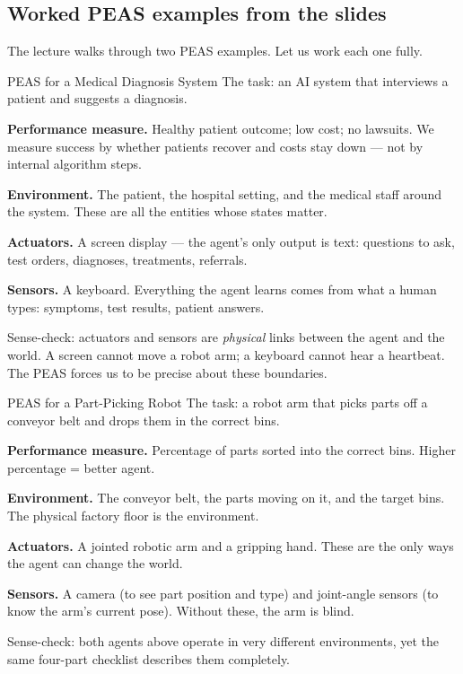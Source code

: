 \documentclass[a4paper,11pt]{article}
\begin{document}
\subsection{Worked PEAS examples from the slides}

The lecture walks through two PEAS examples. Let us work each one fully.

\begin{worked}{PEAS for a Medical Diagnosis System}
The task: an AI system that interviews a patient and suggests a diagnosis.
\begin{steps}
  \item \textbf{Performance measure.} Healthy patient outcome; low cost;
        no lawsuits. We measure success by whether patients recover and costs
        stay down --- not by internal algorithm steps.
  \item \textbf{Environment.} The patient, the hospital setting, and the
        medical staff around the system. These are all the entities whose
        states matter.
  \item \textbf{Actuators.} A screen display --- the agent's only output is
        text: questions to ask, test orders, diagnoses, treatments, referrals.
  \item \textbf{Sensors.} A keyboard. Everything the agent learns comes from
        what a human types: symptoms, test results, patient answers.
\end{steps}
Sense-check: actuators and sensors are \emph{physical} links between the agent
and the world. A screen cannot move a robot arm; a keyboard cannot hear a
heartbeat. The PEAS forces us to be precise about these boundaries.
\end{worked}

\begin{worked}{PEAS for a Part-Picking Robot}
The task: a robot arm that picks parts off a conveyor belt and drops them in
the correct bins.
\begin{steps}
  \item \textbf{Performance measure.} Percentage of parts sorted into the
        correct bins. Higher percentage = better agent.
  \item \textbf{Environment.} The conveyor belt, the parts moving on it,
        and the target bins. The physical factory floor is the environment.
  \item \textbf{Actuators.} A jointed robotic arm and a gripping hand. These
        are the only ways the agent can change the world.
  \item \textbf{Sensors.} A camera (to see part position and type) and joint-angle
        sensors (to know the arm's current pose). Without these, the arm is blind.
\end{steps}
Sense-check: both agents above operate in very different environments, yet the
same four-part checklist describes them completely.
\end{worked}
\end{document}
